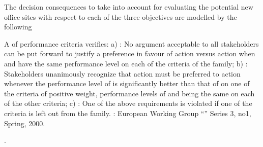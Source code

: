 \documentclass[a4paper,12pt,english]{sphinxhowto}
\begin{document}
The decision consequences to take into account for evaluating the potential new office sites with respect to each of the three objectives are modelled by the following  %
\begin{footnote}[26]\sphinxAtStartFootnote
A  of performance criteria verifies: a) : No argument acceptable to all stakeholders can be put forward to justify a preference in favour of action  versus action   when  and  have the same performance level on each of the criteria of the family; b) : Stakeholders unanimously recognize that action  must be preferred to action  whenever the performance level of  is significantly better than that of  on one of the criteria of positive weight, performance levels of  and  being the same on each of the other criteria; c) : One of the above requirements is violated if one of the criteria is left out from the family. : European Working Group “” Series 3, no1, Spring, 2000.
%
\end{footnote}.
\end{document}
